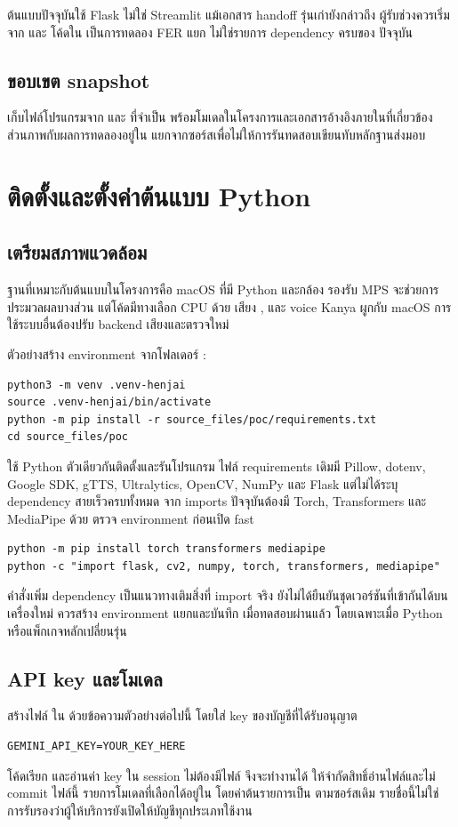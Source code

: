 ต้นแบบปัจจุบันใช้ Flask ไม่ใช่ Streamlit แม้เอกสาร handoff รุ่นเก่ายังกล่าวถึง  ผู้รับช่วงควรเริ่มจาก  และ  โค้ดใน  เป็นการทดลอง FER แยก ไม่ใช่รายการ dependency ครบของ  ปัจจุบัน

\section{ขอบเขต snapshot}
 เก็บไฟล์โปรแกรมจาก  และ  ที่จำเป็น พร้อมโมเดลในโครงการและเอกสารอ้างอิงภายในที่เกี่ยวข้อง ส่วนภาพกับผลการทดลองอยู่ใน  แยกจากซอร์สเพื่อไม่ให้การรันทดสอบเขียนทับหลักฐานส่งมอบ

\chapter{ติดตั้งและตั้งค่าต้นแบบ Python}
\section{เตรียมสภาพแวดล้อม}
ฐานที่เหมาะกับต้นแบบในโครงการคือ macOS ที่มี Python และกล้อง รองรับ MPS จะช่วยการประมวลผลบางส่วน แต่โค้ดมีทางเลือก CPU ด้วย เสียง ,  และ voice Kanya ผูกกับ macOS การใช้ระบบอื่นต้องปรับ backend เสียงและตรวจใหม่

ตัวอย่างสร้าง environment จากโฟลเดอร์ :
\begin{verbatim}
python3 -m venv .venv-henjai
source .venv-henjai/bin/activate
python -m pip install -r source_files/poc/requirements.txt
cd source_files/poc
\end{verbatim}
ใช้ Python ตัวเดียวกันติดตั้งและรันโปรแกรม ไฟล์ requirements เดิมมี Pillow, dotenv, Google SDK, gTTS, Ultralytics, OpenCV, NumPy และ Flask แต่ไม่ได้ระบุ dependency สายเร็วครบทั้งหมด จาก imports ปัจจุบันต้องมี Torch, Transformers และ MediaPipe ด้วย ตรวจ environment ก่อนเปิด fast

\begin{verbatim}
python -m pip install torch transformers mediapipe
python -c "import flask, cv2, numpy, torch, transformers, mediapipe"
\end{verbatim}
คำสั่งเพิ่ม dependency เป็นแนวทางเติมสิ่งที่ import จริง ยังไม่ได้ยืนยันชุดเวอร์ชันที่เข้ากันได้บนเครื่องใหม่ ควรสร้าง environment แยกและบันทึก  เมื่อทดสอบผ่านแล้ว โดยเฉพาะเมื่อ Python หรือแพ็กเกจหลักเปลี่ยนรุ่น

\section{API key และโมเดล}
สร้างไฟล์  ใน  ด้วยข้อความตัวอย่างต่อไปนี้ โดยใส่ key ของบัญชีที่ได้รับอนุญาต
\begin{verbatim}
GEMINI_API_KEY=YOUR_KEY_HERE
\end{verbatim}
โค้ดเรียก  และอ่านค่า key ใน session ไม่ต้องมีไฟล์  จึงจะทำงานได้ ให้จำกัดสิทธิ์อ่านไฟล์และไม่ commit ไฟล์นี้ รายการโมเดลที่เลือกได้อยู่ใน  โดยค่าต้นรายการเป็น  ตามซอร์สเดิม รายชื่อนี้ไม่ใช่การรับรองว่าผู้ให้บริการยังเปิดให้บัญชีทุกประเภทใช้งาน


